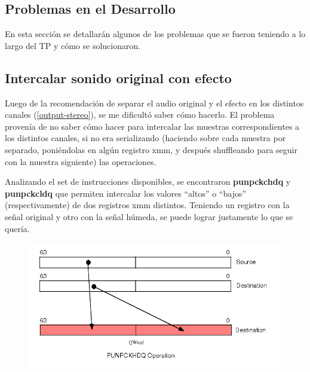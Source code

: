 \subsection{Problemas en el Desarrollo}
\label{subsec:desarrollo-problemas}

En esta sección se detallarán algunos de los problemas que se fueron teniendo a lo largo del TP y cómo se solucionaron.

\subsection{Intercalar sonido original con efecto}
\label{subsec:desarrollo-problemas-stereo-output}
Luego de la recomendación de separar el audio original y el efecto en los distintos canales (\ref{output-stereo}), se me dificultó saber cómo hacerlo. El problema provenía de no saber cómo hacer para intercalar las muestras correspondientes a los distintos canales, si no era serializando (haciendo sobre cada muestra por separado, poniéndolas en algún registro xmm, y después shuffleando para seguir con la muestra siguiente) las operaciones. 

Analizando el set de instrucciones disponibles, se encontraron \textbf{punpckchdq} y \textbf{punpckcldq} que permiten intercalar los valores ``altos'' o ``bajos'' (respectivamente) de dos registros xmm distintos. Teniendo un registro con la señal original y otro con la señal húmeda, se puede lograr justamente lo que se quería. \vspace{\baselineskip}


\begin{figure}[H]
    \centering
    \includegraphics[scale=0.75]{imagenes/punpckhdq.png}
    \label{fig:punpckhdq}
    \caption{ }
\end{figure}

